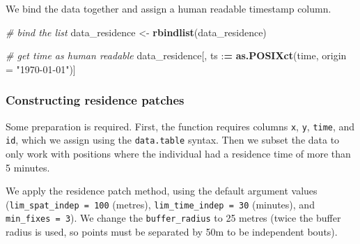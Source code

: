 \documentclass[]{scrartcl}
\newenvironment{Shaded}{}{}
\newcommand{\CommentTok}[1]{\textcolor[rgb]{0.38,0.63,0.69}{\textit{#1}}}
\newcommand{\DataTypeTok}[1]{\textcolor[rgb]{0.56,0.13,0.00}{#1}}
\newcommand{\DecValTok}[1]{\textcolor[rgb]{0.25,0.63,0.44}{#1}}
\newcommand{\ErrorTok}[1]{\textcolor[rgb]{1.00,0.00,0.00}{\textbf{#1}}}
\newcommand{\KeywordTok}[1]{\textcolor[rgb]{0.00,0.44,0.13}{\textbf{#1}}}
\newcommand{\NormalTok}[1]{#1}
\newcommand{\OperatorTok}[1]{\textcolor[rgb]{0.40,0.40,0.40}{#1}}
\newcommand{\StringTok}[1]{\textcolor[rgb]{0.25,0.44,0.63}{#1}}
\begin{document}
We bind the data together and assign a human readable timestamp column.

\begin{Shaded}
\begin{Highlighting}[]
\CommentTok{# bind the list}
\NormalTok{data_residence <-}\StringTok{ }\KeywordTok{rbindlist}\NormalTok{(data_residence)}

\CommentTok{# get time as human readable}
\NormalTok{data_residence[, ts }\OperatorTok{:}\ErrorTok{=}\StringTok{ }\KeywordTok{as.POSIXct}\NormalTok{(time, }\DataTypeTok{origin =} \StringTok{"1970-01-01"}\NormalTok{)]}
\end{Highlighting}
\end{Shaded}

\hypertarget{constructing-residence-patches}{%
\subsubsection{Constructing residence patches}\label{constructing-residence-patches}}

Some preparation is required. First, the function requires columns \texttt{x}, \texttt{y},
\texttt{time}, and \texttt{id}, which we assign using the \texttt{data.table} syntax.
Then we subset the data to only work with positions where the individual had a residence time of more than 5 minutes.

\begin{Shaded}
\end{Shaded}

We apply the residence patch method, using the default argument values (\texttt{lim\_spat\_indep\ =\ 100} (metres), \texttt{lim\_time\_indep\ =\ 30} (minutes), and \texttt{min\_fixes\ =\ 3}). We change the \texttt{buffer\_radius} to 25 metres (twice the buffer radius is used, so points must be separated by 50m to be independent bouts).
\end{document}
